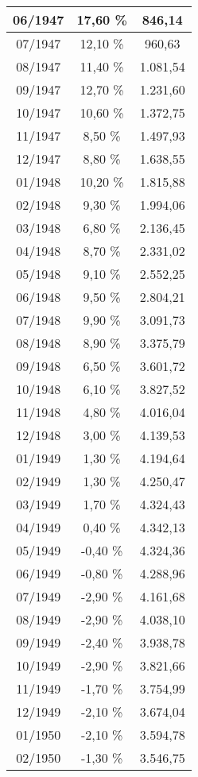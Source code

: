 \begin{center}
\begin{longtable}{|c|c|c|}
06/1947 & 17,60 \% & 846,14 \\ \hline
07/1947 & 12,10 \% & 960,63 \\ \hline
08/1947 & 11,40 \% & 1.081,54 \\ \hline
09/1947 & 12,70 \% & 1.231,60 \\ \hline
10/1947 & 10,60 \% & 1.372,75 \\ \hline
11/1947 & 8,50 \% & 1.497,93 \\ \hline
12/1947 & 8,80 \% & 1.638,55 \\ \hline
01/1948 & 10,20 \% & 1.815,88 \\ \hline
02/1948 & 9,30 \% & 1.994,06 \\ \hline
03/1948 & 6,80 \% & 2.136,45 \\ \hline
04/1948 & 8,70 \% & 2.331,02 \\ \hline
05/1948 & 9,10 \% & 2.552,25 \\ \hline
06/1948 & 9,50 \% & 2.804,21 \\ \hline
07/1948 & 9,90 \% & 3.091,73 \\ \hline
08/1948 & 8,90 \% & 3.375,79 \\ \hline
09/1948 & 6,50 \% & 3.601,72 \\ \hline
10/1948 & 6,10 \% & 3.827,52 \\ \hline
11/1948 & 4,80 \% & 4.016,04 \\ \hline
12/1948 & 3,00 \% & 4.139,53 \\ \hline
01/1949 & 1,30 \% & 4.194,64 \\ \hline
02/1949 & 1,30 \% & 4.250,47 \\ \hline
03/1949 & 1,70 \% & 4.324,43 \\ \hline
04/1949 & 0,40 \% & 4.342,13 \\ \hline
05/1949 & -0,40 \% & 4.324,36 \\ \hline
06/1949 & -0,80 \% & 4.288,96 \\ \hline
07/1949 & -2,90 \% & 4.161,68 \\ \hline
08/1949 & -2,90 \% & 4.038,10 \\ \hline
09/1949 & -2,40 \% & 3.938,78 \\ \hline
10/1949 & -2,90 \% & 3.821,66 \\ \hline
11/1949 & -1,70 \% & 3.754,99 \\ \hline
12/1949 & -2,10 \% & 3.674,04 \\ \hline
01/1950 & -2,10 \% & 3.594,78 \\ \hline
02/1950 & -1,30 \% & 3.546,75 \\ \hline

\end{longtable}
\end{center}
